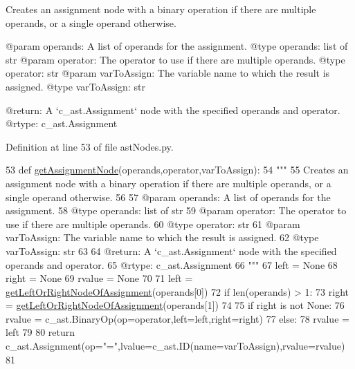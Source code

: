 \begin{DoxyVerb}Creates an assignment node with a binary operation if there are multiple operands, or a single operand otherwise.

@param operands: A list of operands for the assignment.
@type operands: list of str
@param operator: The operator to use if there are multiple operands.
@type operator: str
@param varToAssign: The variable name to which the result is assigned.
@type varToAssign: str

@return: A `c_ast.Assignment` node with the specified operands and operator.
@rtype: c_ast.Assignment
\end{DoxyVerb}
 

Definition at line 53 of file ast\+Nodes.\+py.


\begin{DoxyCode}
53 \textcolor{keyword}{def }\hyperlink{namespacePostProcessor_1_1astNodes_aa6c634c9a1dceb3e9cc65cadadf5f450}{getAssignmentNode}(operands,operator,varToAssign):
54     \textcolor{stringliteral}{"""
}
55 \textcolor{stringliteral}{    Creates an assignment node with a binary operation if there are multiple operands, or a single operand
       otherwise.
}
56 \textcolor{stringliteral}{
}
57 \textcolor{stringliteral}{    @param operands: A list of operands for the assignment.
}
58 \textcolor{stringliteral}{    @type operands: list of str
}
59 \textcolor{stringliteral}{    @param operator: The operator to use if there are multiple operands.
}
60 \textcolor{stringliteral}{    @type operator: str
}
61 \textcolor{stringliteral}{    @param varToAssign: The variable name to which the result is assigned.
}
62 \textcolor{stringliteral}{    @type varToAssign: str
}
63 \textcolor{stringliteral}{
}
64 \textcolor{stringliteral}{    @return: A `c\_ast.Assignment` node with the specified operands and operator.
}
65 \textcolor{stringliteral}{    @rtype: c\_ast.Assignment
}
66 \textcolor{stringliteral}{    """}
67     left = \textcolor{keywordtype}{None}
68     right = \textcolor{keywordtype}{None}
69     rvalue = \textcolor{keywordtype}{None}
70 
71     left = \hyperlink{namespacePostProcessor_1_1astNodes_afb1489449acb633bf78b48165fe578be}{getLeftOrRightNodeOfAssignment}(operands[0])
72     \textcolor{keywordflow}{if} len(operands) > 1:
73         right = \hyperlink{namespacePostProcessor_1_1astNodes_afb1489449acb633bf78b48165fe578be}{getLeftOrRightNodeOfAssignment}(operands[1])
74     
75     \textcolor{keywordflow}{if} right \textcolor{keywordflow}{is} \textcolor{keywordflow}{not} \textcolor{keywordtype}{None}:
76         rvalue = c\_ast.BinaryOp(op=operator,left=left,right=right)
77     \textcolor{keywordflow}{else}:
78         rvalue = left
79     
80     \textcolor{keywordflow}{return} c\_ast.Assignment(op=\textcolor{stringliteral}{"="},lvalue=c\_ast.ID(name=varToAssign),rvalue=rvalue)
81 
\end{DoxyCode}
